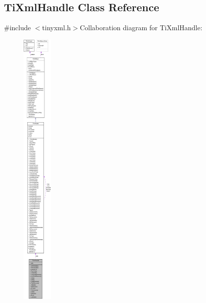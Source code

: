 \hypertarget{class_ti_xml_handle}{
\subsection{TiXmlHandle Class Reference}
\label{class_ti_xml_handle}
}


{\ttfamily \#include $<$tinyxml.h$>$}Collaboration diagram for TiXmlHandle:\nopagebreak
\begin{figure}[H]
\begin{center}
\leavevmode
\includegraphics[height=400pt]{class_ti_xml_handle__coll__graph}
\end{center}
\end{figure}
